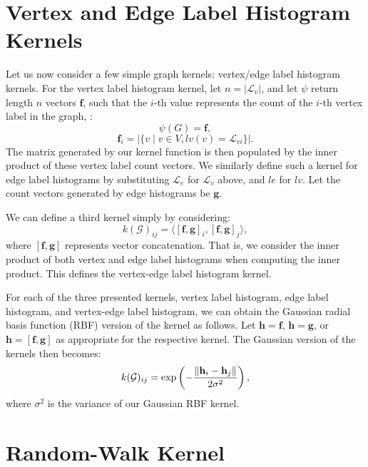 \section{Vertex and Edge Label Histogram Kernels}
\label{appendix:graph_kernels:histogram}

Let us now consider a few simple graph kernels: vertex/edge label histogram
kernels. For the vertex label histogram kernel, let $n=|\mathcal{L}_v|$, and let
$\psi$ return length $n$ vectors $\mathbf{f}$, such that the $i$-th value
represents the count of the $i$-th vertex label in the graph, \ie: 
\begin{equation}
    \psi(G) = \mathbf{f},
\end{equation}
\begin{equation}
    \mathbf{f}_i=|\{v \mid v \in V, lv(v) = \mathcal{L}_{vi}\}|.
\end{equation}
%
The matrix generated by our kernel function is then populated by the inner
product of these vertex label count vectors.
We similarly define such a kernel for edge label histograms by substituting
$\mathcal{L}_e$ for $\mathcal{L}_v$ above, and $le$ for $lv$. Let the count
vectors generated by edge histograms be $\mathbf{g}$.

We can define a third kernel simply by considering:
\begin{equation}
    k(\mathcal{G})_{ij} = \langle[\mathbf{f},\mathbf{g}]_i, [\mathbf{f},\mathbf{g}]_j\rangle,
\end{equation}
%
where $[\mathbf{f},\mathbf{g}]$ represents vector concatenation. That is, we
consider the inner product of both vertex and edge label histograms when
computing the inner product. This defines the vertex-edge label histogram
kernel.

For each of the three presented kernels, vertex label histogram, edge label
histogram, and vertex-edge label histogram, we can obtain the Gaussian radial
basis function (RBF) version of the kernel as follows. Let $\mathbf{h} =
\mathbf{f}$, $\mathbf{h} = \mathbf{g}$, or $\mathbf{h} = \mathbf{[\mathbf{f},
\mathbf{g}]}$ as appropriate for the respective kernel. The Gaussian version of
the kernels then becomes:
\begin{equation}
    k(\mathcal{G})_{ij} = \text{exp}\left(-\frac{\lVert\mathbf{h}_i - \mathbf{h}_j\rVert}{2\sigma^2}\right),
\end{equation}
%
where $\sigma^2$ is the variance of our Gaussian RBF kernel.


\section{Random-Walk Kernel}
\label{appendix:graph_kernels:random_walk}

